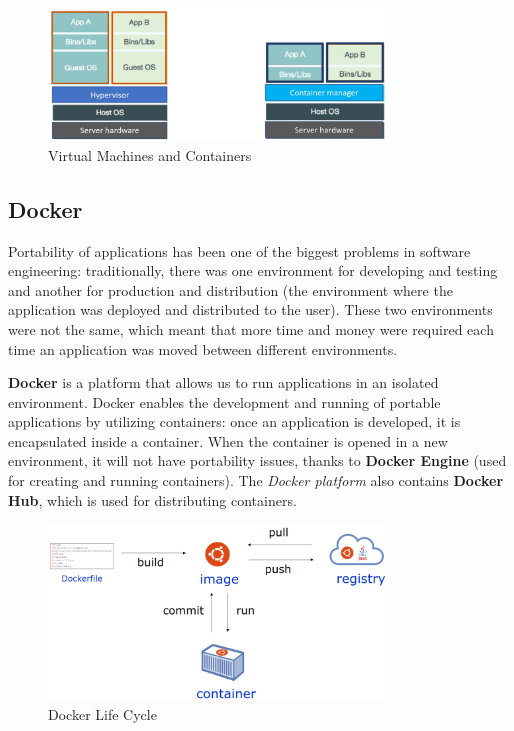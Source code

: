 \begin{figure}[H]
    \centering
    \includegraphics[width=0.8\textwidth]{images/Cloud/virtualizedresources.png}
    \caption{Virtual Machines and Containers}
    \label{fig:virtualizedresources}
\end{figure}

\subsection{Docker}

Portability of applications has been one of the biggest problems in software engineering: traditionally, there was one environment for developing and testing and another for production and distribution (the environment where the application was deployed and distributed to the user). These two environments were not the same, which meant that more time and money were required each time an application was moved between different environments.

\textbf{Docker} is a platform that allows us to run applications in an isolated environment. Docker enables the development and running of portable applications by utilizing containers: once an application is developed, it is encapsulated inside a container. When the container is opened in a new environment, it will not have portability issues, thanks to \textbf{Docker Engine} (used for creating and running containers). The \emph{Docker platform} also contains \textbf{Docker Hub}, which is used for distributing containers.

\begin{figure}[H]
    \centering
    \includegraphics[width=0.8\textwidth]{images/Cloud/DockerCycle.png}
    \caption{Docker Life Cycle}
    \label{fig:DockerCycle}
\end{figure}

